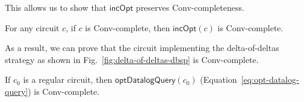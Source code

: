 This allows us to show that $\mathsf{incOpt}$ preserves Conv-completeness.
\begin{theorem}\label{thm:incOpt-convcomplete}
    For any circuit $c$, if $c$ is Conv-complete, then $\mathsf{incOpt}(c)$ is Conv-complete.
\end{theorem}

As a result, we can prove that the circuit implementing the delta-of-deltas strategy as shown in Fig.~\ref{fig:delta-of-deltas-dbsp} is Conv-complete.
\begin{proposition}
   If $c_0$ is a regular circuit, then $\mathsf{optDatalogQuery}(c_0)$ (Equation~\ref{eq:opt-datalog-query}) is Conv-complete.
\end{proposition}
